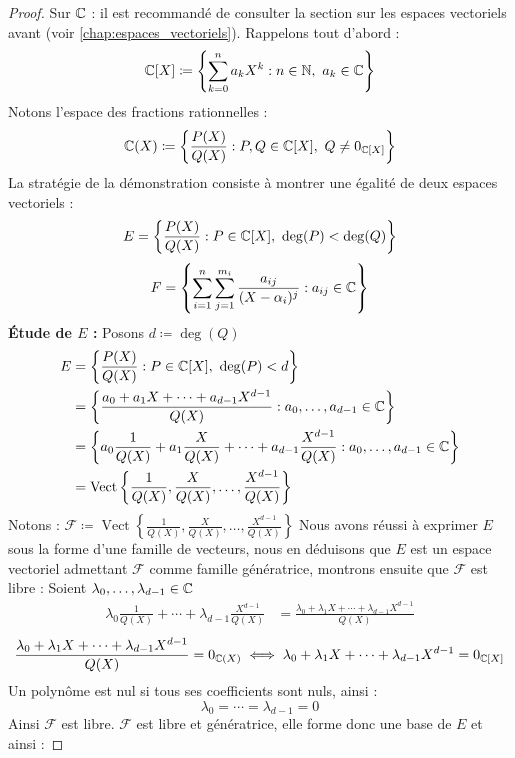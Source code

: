 \begin{proof}\cite{math-sup.fr_decomp}
    Sur $\mathbb{C}$ : il est recommandé de consulter la section sur les espaces vectoriels avant (voir \autoref{chap:espaces_vectoriels}).
    Rappelons tout d'abord :
    \[ \mathbb{C}[X] \coloneqq \left\{ \sum_{k = 0}^{n} a_k X^k : n \in \mathbb{N},\ a_k \in \mathbb{C} \right\} \]
    Notons l'espace des fractions rationnelles :
    \[ \mathbb{C}(X) \coloneqq \left\{ \frac{P(X)}{Q(X)} : P, Q \in \mathbb{C}[X],\ Q \neq 0_{\mathbb{C}[X]} \right\} \]
    La stratégie de la démonstration consiste à montrer une égalité de deux espaces vectoriels :
    \[ E = \left\{ \frac{P(X)}{Q(X)} : P \in \mathbb{C}[X],\ \deg(P) < \deg(Q) \right\} \]
    \[ F = \left\{ \sum_{i = 1}^{n} \sum_{j = 1}^{m_i} \frac{a_{ij}}{(X - \alpha_i)^{j}} : a_{ij} \in \mathbb{C} \right\} \]
    \textbf{\'Etude de $E$ :} Posons $d \coloneqq \deg(Q)$
    \begin{align*}
        E &= \left\{ \frac{P(X)}{Q(X)} : P \in \mathbb{C}[X],\ \deg(P) < d \right\} \\
          &= \left\{ \frac{a_0 + a_1X + \cdots + a_{d - 1} X^{d - 1}}{Q(X)} : a_0, \ldots, a_{d - 1} \in \mathbb{C} \right\} \\
          &= \left\{ a_0 \frac{1}{Q(X)} + a_1 \frac{X}{Q(X)} + \cdots + a_{d - 1} \frac{X^{d-1}}{Q(X)} : a_0, \ldots, a_{d - 1} \in \mathbb{C} \right\} \\
          &= \operatorname{Vect}\left\{ \frac{1}{Q(X)}, \frac{X}{Q(X)}, \ldots, \frac{X^{d-1}}{Q(X)} \right\}
    \end{align*}
    Notons : $\mathcal{F} \coloneqq \operatorname{Vect}\left\{ \frac{1}{Q(X)}, \frac{X}{Q(X)}, \ldots, \frac{X^{d-1}}{Q(X)} \right\}$
    Nous avons réussi à exprimer $E$ sous la forme d'une famille de vecteurs, nous en déduisons que $E$ est un espace vectoriel admettant $\mathcal{F}$ comme famille génératrice, montrons ensuite que $\mathcal{F}$ est libre :
    Soient $ \lambda_0,\ldots,\lambda_{d-1} \in \mathbb{C}$
    \begin{align*}
        \lambda_0 \frac{1}{Q(X)} + \cdots + \lambda_{d - 1} \frac{X^{d-1}}{Q(X)} &= \frac{\lambda_0 + \lambda_{1} X + \cdots + \lambda_{d - 1} X^{d - 1}}{Q(X)}
    \end{align*}
    \[ \frac{\lambda_0 + \lambda_{1} X + \cdots + \lambda_{d - 1} X^{d - 1}}{Q(X)} = 0_{\mathbb{C}(X)} \iff \lambda_0 + \lambda_{1} X + \cdots + \lambda_{d - 1} X^{d - 1} = 0_{\mathbb{C}[X]} \]
    Un polynôme est nul si tous ses coefficients sont nuls, ainsi :
    \[ \lambda_0 = \cdots = \lambda_{d-1} = 0 \]
    Ainsi $\mathcal{F}$ est libre. $\mathcal{F}$ est libre et génératrice, elle forme donc une base de $E$ et ainsi : 

\end{proof}

